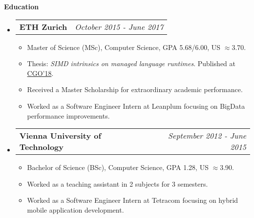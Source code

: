 \documentclass[letterpaper,10pt]{article}
\makeatletter
\newcommand{\resheading}[1]{{\large \colorbox{mygrey}{\begin{minipage}{\textwidth}{\textbf{#1 \vphantom{p\^{E}}}}\end{minipage}}}}
\newcommand{\ressubheading}[4]{
\begin{tabular*}{7.0in}{l@{\extracolsep{\fill}}r}
		\textbf{#1} & \textit{#4} \\
\end{tabular*}\vspace{-6pt}}
\makeatother
\begin{document}
\resheading{Education}
\begin{itemize}
\item
\ressubheading{ETH Zurich}{}{}{October 2015 - June 2017}
\begin{itemize}
\item Master of Science (MSc), Computer Science, GPA 5.68/6.00, US $\approx$3.70.
\item Thesis: {\it{SIMD intrinsics on managed language runtimes}}. Published at  \href{https://dl.acm.org/doi/10.1145/3168810}{CGO'18}.
\item Received a Master Scholarship for extraordinary academic performance.
\item Worked as a Software Engineer Intern at Leanplum focusing on BigData performance improvements.
\end{itemize}

\item \ressubheading{Vienna University of Technology}{}{}{September 2012 - June 2015}
\begin{itemize}
\item Bachelor of Science (BSc), Computer Science, GPA 1.28, US $\approx$3.90.
\item Worked as a teaching assistant in 2 subjects for 3 semesters.
\item Worked as a Software Engineer Intern at Tetracom focusing on hybrid mobile application development.
\end{itemize}

\end{itemize}
\end{document}
